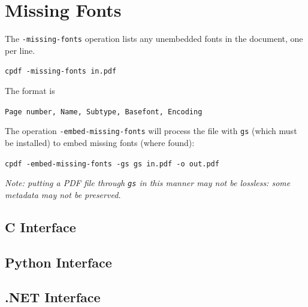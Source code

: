 \documentclass{book}
\begin{document}
\section{Missing Fonts}
  The \verb!-missing-fonts! operation lists any unembedded fonts in the document, one per line.
  \begin{framed}
  \small\noindent\verb!cpdf -missing-fonts in.pdf!
  \end{framed}

  \noindent The format is
  \begin{framed}
  \small\noindent\verb!Page number, Name, Subtype, Basefont, Encoding!
  \end{framed}

\noindent The operation \texttt{-embed-missing-fonts} will process the file with \texttt{gs} (which must be installed) to embed missing fonts (where found):

  \begin{framed}
  \small\noindent\verb!cpdf -embed-missing-fonts -gs gs in.pdf -o out.pdf!
  \end{framed}

\noindent\textit{Note: putting a PDF file through \texttt{gs} in this manner may not be lossless: some metadata may not be preserved.}

\label{listmisingfonts}\clearpage\pagestyle{empty}

\begin{cpdflib}
\clearpage
\section*{C Interface}
\begin{small}\tt

\end{small}
\end{cpdflib}

\begin{pycpdflib}
\clearpage
\section*{Python Interface}
\begin{small}\tt

\end{small}
\end{pycpdflib}

\begin{dotnetcpdflib}
\clearpage
\section*{.NET Interface}
\begin{small}\tt

\end{small}
\end{dotnetcpdflib}
\end{document}

